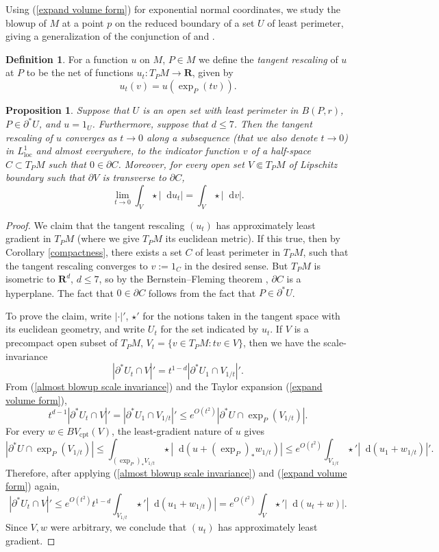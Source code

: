 \documentclass[reqno,10pt]{amsart}
\newcommand{\RR}{\mathbf{R}}
\newcommand*\dif{\mathop{}\!\mathrm{d}}
\newcommand{\dfn}[1]{\emph{#1}\index{#1}}
\newcommand{\loc}{\mathrm{loc}}
\newcommand{\cpt}{\mathrm{cpt}}
\newtheorem{proposition}[theorem]{Proposition}
\theoremstyle{definition}
\newtheorem{definition}[theorem]{Definition}
\numberwithin{equation}{section}
\begin{document}
Using (\ref{expand volume form}) for exponential normal coordinates, we study the blowup of $M$ at a point $p$ on the reduced boundary of a set $U$ of least perimeter, giving a generalization of the conjunction of \cite[Theorem 9.3]{Giusti77} and \cite[Theorem 6.2.2]{Simons68}.

\begin{definition}
For a function $u$ on $M$, $P \in M$ we define the \dfn{tangent rescaling} of $u$ at $P$ to be the net of functions $u_t: T_PM \to \RR$, given by
$$u_t(v) = u\left(\exp_P(tv)\right).$$
\end{definition}

\begin{proposition}\label{blowup theorem}
Suppose that $U$ is an open set with least perimeter in $B(P, r)$, $P \in \partial^* U$, and $u = 1_U$.
Furthermore, suppose that $d \leq 7$.
Then the tangent rescaling of $u$ converges as $t \to 0$ along a subsequence (that we also denote $t \to 0$) in $L^1_\loc$ and almost everywhere, to the indicator function $v$ of a half-space $C \subset T_PM$ such that $0 \in \partial C$.
Moreover, for every open set $V \Subset T_PM$ of Lipschitz boundary such that $\partial V$ is transverse to $\partial C$,
$$\lim_{t \to 0} \int_V \star |\dif u_t| = \int_V \star |\dif v|.$$
\end{proposition}
\begin{proof}
We claim that the tangent rescaling $(u_t)$ has approximately least gradient in $T_PM$ (where we give $T_PM$ its euclidean metric). If this true, then by Corollary \ref{compactness}, there exists a set $C$ of least perimeter in $T_PM$, such that the tangent rescaling converges to $v := 1_C$ in the desired sense.
But $T_PM$ is isometric to $\RR^d$, $d \leq 7$, so by the Bernstein--Fleming theorem \cite[Theorem 17.3]{Giusti77}, $\partial C$ is a hyperplane.
The fact that $0 \in \partial C$ follows from the fact that $P \in \partial^* U$.

To prove the claim, write $|\cdot|'$, $\star'$ for the notions taken in the tangent space with its euclidean geometry, and write $U_t$ for the set indicated by $u_t$.
If $V$ is a precompact open subset of $T_PM$, $V_t = \{v \in T_PM: tv \in V\}$, then we have the scale-invariance
\begin{equation}\label{almost blowup scale invariance}
|\partial^* U_t \cap V|' = t^{1 - d}|\partial^* U_1 \cap V_{1/t}|'.
\end{equation}
From (\ref{almost blowup scale invariance}) and the Taylor expansion (\ref{expand volume form}),
$$t^{d - 1} |\partial^* U_t \cap V|' = |\partial^* U_1 \cap V_{1/t}|' \leq e^{O(t^2)} |\partial^* U \cap \exp_P(V_{1/t})|.$$
For every $w \in BV_\cpt(V)$, the least-gradient nature of $u$ gives
$$|\partial^* U \cap \exp_P(V_{1/t})| \leq \int_{(\exp_P)_* V_{1/t}} \star |\dif(u + (\exp_P)_* w_{1/t})| \leq e^{O(t^2)} \int_{V_{1/t}} \star'|\dif(u_1 + w_{1/t})|'.$$
Therefore, after applying (\ref{almost blowup scale invariance}) and (\ref{expand volume form}) again,
$$|\partial^* U_t \cap V|' \leq e^{O(t^2)} t^{1 - d} \int_{V_{1/t}} \star' |\dif (u_1 + w_{1/t})| = e^{O(t^2)} \int_V \star' |\dif (u_t + w)|.$$
Since $V,w$ were arbitrary, we conclude that $(u_t)$ has approximately least gradient.
\end{proof}
\end{document}
